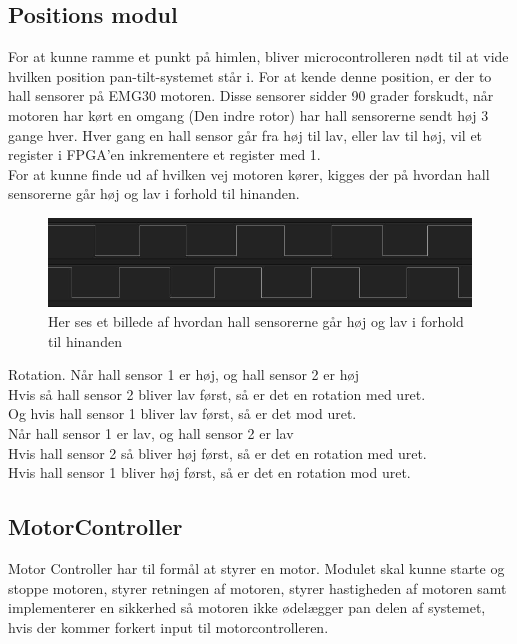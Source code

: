 \subsection{Positions modul}

For at kunne ramme et punkt på himlen, bliver microcontrolleren nødt til at vide hvilken position pan-tilt-systemet står i.
For at kende denne position, er der to hall sensorer på EMG30 motoren.
Disse sensorer sidder 90 grader forskudt, når motoren har kørt en omgang (Den indre rotor) har hall sensorerne sendt høj 3 gange hver.
Hver gang en hall sensor går fra høj til lav, eller lav til høj, vil et register i FPGA'en inkrementere et register med 1.\\

For at kunne finde ud af hvilken vej motoren kører, kigges der på hvordan hall sensorerne går høj og lav i forhold til hinanden.

\begin{figure}[ht]
	\begin{center}
		\includegraphics[scale=0.5]{Billeder/Hall_sensorer.png}
	\end{center}
\label{fig:Hall_Sensorer}
\caption{Her ses et billede af hvordan hall sensorerne går høj og lav i forhold til hinanden}
\end{figure}

Rotation.
Når hall sensor 1 er høj, og hall sensor 2 er høj\\
Hvis så hall sensor 2 bliver lav først, så er det en rotation med uret.\\
Og hvis hall sensor 1 bliver lav først, så er det mod uret.\\

Når hall sensor 1 er lav, og hall sensor 2 er lav\\
Hvis hall sensor 2 så bliver høj først, så er det en rotation med uret.\\
Hvis hall sensor 1 bliver høj først, så er det en rotation mod uret.\\

\subsection{MotorController}
Motor Controller har til formål at styrer en motor. Modulet skal kunne starte og stoppe motoren, styrer retningen af motoren, styrer hastigheden af motoren samt implementerer en sikkerhed så motoren ikke ødelægger pan delen af systemet, hvis der kommer forkert input til motorcontrolleren.

